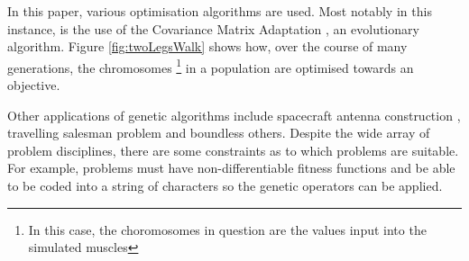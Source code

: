 \documentclass[a4paper]{report}
\begin{document}
In this paper, various optimisation algorithms are used. Most notably in this instance, is the use of the Covariance Matrix Adaptation \cite{CMA}, an evolutionary algorithm. Figure \ref{fig:twoLegsWalk} shows how, over the course of many generations, the chromosomes \footnote{In this case, the choromosomes in question are the values input into the simulated muscles} in a population are optimised towards an objective.

Other applications of genetic algorithms include spacecraft antenna construction \cite{wiggleAntenna}, travelling salesman problem \cite{travellingSales} and boundless others. Despite the wide array of problem disciplines, there are some constraints as to which problems are suitable. For example, problems must have non-differentiable fitness functions and be able to be coded into a string of characters so the genetic operators can be applied.
\end{document}
